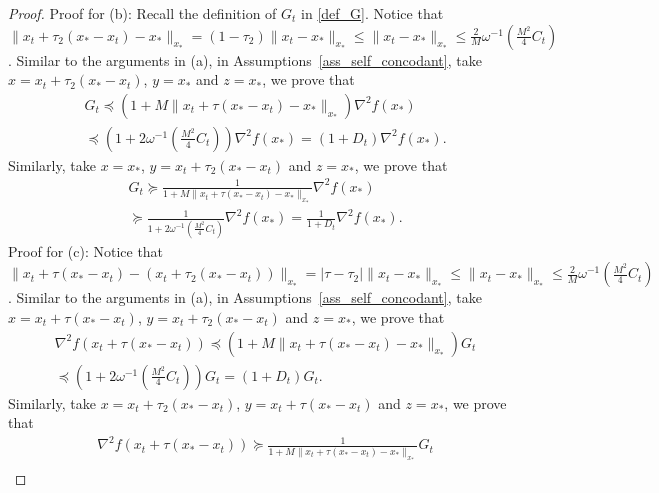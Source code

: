 \documentclass[10pt,a4paper]{amsart}
\begin{document}
\begin{proof}
    Proof for (b): Recall the definition of $G_t$ in \eqref{def_G}. Notice that $\|x_t + \tau_2 (x_{*} - x_t) - x_*\|_{x_*} = (1 - \tau_2)\|x_t - x_*\|_{x_*} \leq \|x_t - x_*\|_{x_*} \leq \frac{2}{M}\omega^{-1}(\frac{M^2}{4}C_t)$. Similar to the arguments in (a), in Assumptions~\ref{ass_self_concodant}, take $x = x_t + \tau_2 (x_{*} - x_t)$, $y = x_*$ and $z = x_*$, we prove that 
    \begin{equation}
    \begin{split}
        & G_t \preceq (1 + M\|x_t + \tau (x_{*} - x_t) - x_*\|_{x_*})\nabla^2{f(x_*)} \\
        & \preceq (1 + 2\omega^{-1}(\frac{M^2}{4}C_t))\nabla^2{f(x_*)} = (1 + D_t)\nabla^2{f(x_*)}.
    \end{split}
    \end{equation}
    Similarly, take $x = x_*$, $y = x_t + \tau_2 (x_{*} - x_t)$ and $z = x_*$, we prove that 
    \begin{equation}
    \begin{split}
        & G_t \succeq \frac{1}{1 + M\|x_t + \tau (x_{*} - x_t) - x_*\|_{x_*}}\nabla^2{f(x_*)} \\
        & \succeq \frac{1}{1 + 2\omega^{-1}(\frac{M^2}{4}C_t)}\nabla^2{f(x_*)} = \frac{1}{1 + D_t}\nabla^2{f(x_*)}.
    \end{split}
    \end{equation}
    Proof for (c): Notice that $\|x_t + \tau (x_{*} - x_t) - (x_t + \tau_2 (x_{*} - x_t))\|_{x_*} = |\tau - \tau_2|\|x_t - x_*\|_{x_*} \leq \|x_t - x_*\|_{x_*} \leq \frac{2}{M}\omega^{-1}(\frac{M^2}{4}C_t)$. Similar to the arguments in (a), in Assumptions~\ref{ass_self_concodant}, take $x = x_t + \tau (x_{*} - x_t)$, $y = x_t + \tau_2 (x_{*} - x_t)$ and $z = x_*$, we prove that 
    \begin{equation}
    \begin{split}
        & \nabla^2{f(x_t + \tau(x_* - x_t))}  \preceq (1 + M\|x_t + \tau (x_{*} - x_t) - x_*\|_{x_*})G_t \\
        & \preceq (1 + 2\omega^{-1}(\frac{M^2}{4}C_t))G_t = (1 + D_t)G_t.
    \end{split}
    \end{equation}
    Similarly, take $x = x_t + \tau_2 (x_{*} - x_t)$, $y = x_t + \tau (x_{*} - x_t)$ and $z = x_*$, we prove that 
    \begin{equation}
    \begin{split}
        & \nabla^2{f(x_t + \tau(x_* - x_t))}  \succeq \frac{1}{1 + M\|x_t + \tau (x_{*} - x_t) - x_*\|_{x_*}}G_t \\

\end{split}
\end{equation}
\end{proof}
\end{document}
